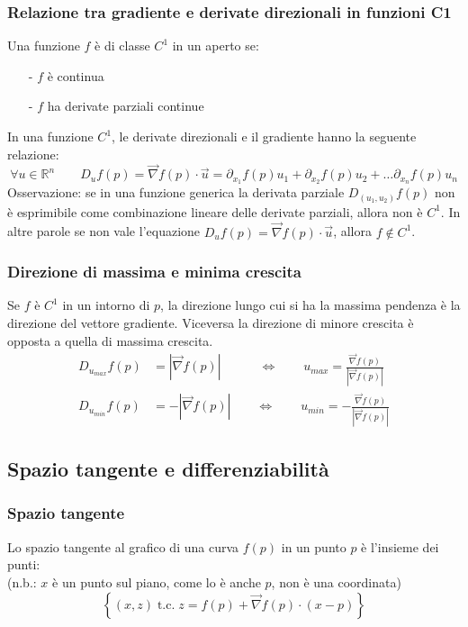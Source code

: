 \documentclass[a4paper]{article}
\newcommand\Rn{\mathbb{R}^n}  %
\newcommand\tc{\text{t.c.}}   %
\begin{document}
\subsubsection*{Relazione tra gradiente e derivate direzionali in funzioni C1}
Una funzione \(f\) è di classe \(C^1\) in un aperto se:
\begin{itemize}[topsep=3pt, itemsep=0pt]
	\item[-] \(f\) è continua
	\item[-] \(f\) ha derivate parziali continue
\end{itemize}
In una funzione \(C^1\), le derivate direzionali e il gradiente hanno la seguente relazione:
\[\forall u \in \Rn \qquad D_u f(p) = \vec{\nabla} f(p) \cdot \vec{u} = \partial_{x_1} f(p) u_1 + \partial_{x_2} f(p) u_2 + \dots \partial_{x_n} f(p) u_n\]
Osservazione: se in una funzione generica la derivata parziale \(D_{(u_1, u_2)} f(p)\) non è esprimibile come combinazione
lineare delle derivate parziali, allora non è \(C^1\). In altre parole se non vale l'equazione \(D_u f(p) = \vec{\nabla} f(p) \cdot \vec{u}\), allora \(f \notin C^1\).

\subsubsection*{Direzione di massima e minima crescita}
Se \(f\) è \(C^1\) in un intorno di \(p\), la direzione lungo cui si ha la massima pendenza è la direzione del vettore gradiente.
Viceversa la direzione di minore crescita è opposta a quella di massima crescita.
\begin{align*}
	D_{u_{max}} f(p) &= \left| \vec{\nabla} f(p)\right| \qquad \quad \Leftrightarrow \qquad u_{max} = \frac{\vec{\nabla} f(p)}{\left| \vec{\nabla} f(p) \right|} \\
	D_{u_{min}} f(p) &= -\left| \vec{\nabla} f(p)\right| \qquad \Leftrightarrow \qquad u_{min} = -\frac{\vec{\nabla} f(p)}{\left| \vec{\nabla} f(p) \right|}
\end{align*}

\subsection{Spazio tangente e differenziabilità}
\subsubsection*{Spazio tangente}
Lo spazio tangente al grafico di una curva \(f(p)\) in un punto \(p\) è l'insieme dei punti: \\
(n.b.: \(x\) è un punto sul piano, come lo è anche \(p\), non è una coordinata)
\[\left\{ (x,z) \; \tc \; z = f(p) + \vec{\nabla} f(p) \cdot (x-p)\right\}\] 
\end{document}
